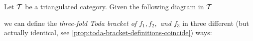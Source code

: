 Let \( {\mathcal{T}} \) be a triangulated category. Given the following diagram in \( {\mathcal{T}} \)
\begin{center}
\end{center}
we can define the \emph{three-fold Toda bracket of \( f_1, f_2, \) and \( f_3 \)} in three different (but actually identical, see \autoref{prop:toda-bracket-definitions-coincide}) ways:

